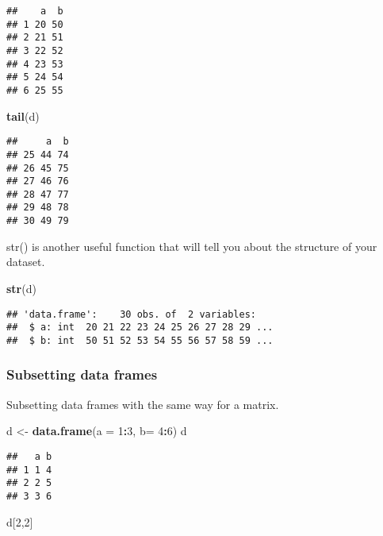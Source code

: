 \documentclass[
]{article}
\newenvironment{Shaded}{\begin{snugshade}}{\end{snugshade}}
\newcommand{\DataTypeTok}[1]{\textcolor[rgb]{0.13,0.29,0.53}{#1}}
\newcommand{\DecValTok}[1]{\textcolor[rgb]{0.00,0.00,0.81}{#1}}
\newcommand{\KeywordTok}[1]{\textcolor[rgb]{0.13,0.29,0.53}{\textbf{#1}}}
\newcommand{\NormalTok}[1]{#1}
\newcommand{\OperatorTok}[1]{\textcolor[rgb]{0.81,0.36,0.00}{\textbf{#1}}}
\newcommand{\StringTok}[1]{\textcolor[rgb]{0.31,0.60,0.02}{#1}}
\begin{document}
\begin{verbatim}
##    a  b
## 1 20 50
## 2 21 51
## 3 22 52
## 4 23 53
## 5 24 54
## 6 25 55
\end{verbatim}

\begin{Shaded}
\begin{Highlighting}[]
\KeywordTok{tail}\NormalTok{(d)}
\end{Highlighting}
\end{Shaded}

\begin{verbatim}
##     a  b
## 25 44 74
## 26 45 75
## 27 46 76
## 28 47 77
## 29 48 78
## 30 49 79
\end{verbatim}

str() is another useful function that will tell you about the structure
of your dataset.

\begin{Shaded}
\begin{Highlighting}[]
\KeywordTok{str}\NormalTok{(d)}
\end{Highlighting}
\end{Shaded}

\begin{verbatim}
## 'data.frame':    30 obs. of  2 variables:
##  $ a: int  20 21 22 23 24 25 26 27 28 29 ...
##  $ b: int  50 51 52 53 54 55 56 57 58 59 ...
\end{verbatim}

\hypertarget{subsetting-data-frames}{%
\subsubsection{Subsetting data frames}\label{subsetting-data-frames}}

Subsetting data frames with the same way for a matrix.

\begin{Shaded}
\begin{Highlighting}[]
\NormalTok{d <-}\StringTok{ }\KeywordTok{data.frame}\NormalTok{(}\DataTypeTok{a =} \DecValTok{1}\OperatorTok{:}\DecValTok{3}\NormalTok{, }\DataTypeTok{b=} \DecValTok{4}\OperatorTok{:}\DecValTok{6}\NormalTok{)}
\NormalTok{d}
\end{Highlighting}
\end{Shaded}

\begin{verbatim}
##   a b
## 1 1 4
## 2 2 5
## 3 3 6
\end{verbatim}

\begin{Shaded}
\begin{Highlighting}[]
\NormalTok{d[}\DecValTok{2}\NormalTok{,}\DecValTok{2}\NormalTok{]}
\end{Highlighting}
\end{Shaded}
\end{document}
